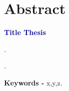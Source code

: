 \chapter*{Abstract}

{\Large \textcolor{darkblue}{\textbf{Title Thesis}}}

\textit{\large
\lipsum[1-3].} 

\textit{\lipsum[4-6].}


\textbf{Keywords -} x,y,z.

